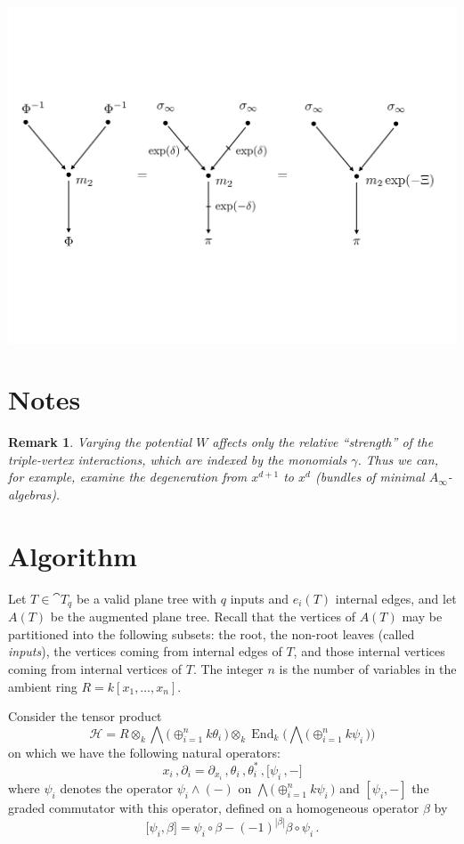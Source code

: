 \documentclass[english,letter paper,12pt,leqno]{article}
\theoremstyle{example}
\newtheorem{remark}[theorem]{Remark}
\numberwithin{equation}{section}
\DeclareMathOperator{\End}{End}
\begin{document}
\begin{center}
\includegraphics[scale=0.35]{diagram-2}
\end{center}

\section{Notes}

\begin{remark} Varying the potential $W$ affects only the relative ``strength'' of the triple-vertex interactions, which are indexed by the monomials $\gamma$. Thus we can, for example, examine the degeneration from $x^{d+1}$ to $x^d$ (bundles of minimal $A_\infty$-algebras).
\end{remark}

\section{Algorithm}

Let $T \in \cat{T}_q$ be a valid plane tree with $q$ inputs and $e_i(T)$ internal edges, and let $A(T)$ be the augmented plane tree. Recall that the vertices of $A(T)$ may be partitioned into the following subsets: the root, the non-root leaves (called \emph{inputs}), the vertices coming from internal edges of $T$, and those internal vertices coming from internal vertices of $T$. The integer $n$ is the number of variables in the ambient ring $R = k[x_1,\ldots,x_n]$. 

Consider the tensor product
\[
\mathscr{H} = R \otimes_k \bigwedge\big( \oplus_{i=1}^n k \theta_i \,\big) \otimes_k \End_k\Big( \bigwedge\big( \oplus_{i=1}^n k \psi_i \, \big) \Big)
\]
on which we have the following natural operators:
\[
x_i\,, \partial_i = \partial_{x_i}\,, \theta_i\,, \theta_i^*\,, \big[\psi_i\,,-\big]
\]
where $\psi_i$ denotes the operator $\psi_i \wedge (-)$ on $\bigwedge\big( \oplus_{i=1}^n k \psi_i \, \big)$ and $[ \psi_i, - ]$ the graded commutator with this operator, defined on a homogeneous operator $\beta$ by
\[
\big[ \psi_i, \beta \big] = \psi_i \circ \beta - (-1)^{|\beta|} \beta \circ \psi_i\,.
\]
\end{document}
